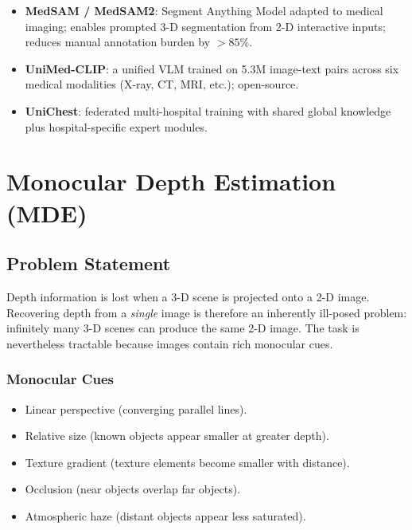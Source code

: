 \documentclass[12pt,a4paper]{report}
\begin{document}
\begin{itemize}[itemsep=2pt]
    \item \textbf{MedSAM / MedSAM2}: Segment Anything Model adapted to medical
          imaging; enables prompted 3-D segmentation from 2-D interactive
          inputs; reduces manual annotation burden by $>85\%$.
    \item \textbf{UniMed-CLIP}: a unified VLM trained on 5.3M image-text pairs
          across six medical modalities (X-ray, CT, MRI, etc.); open-source.
    \item \textbf{UniChest}: federated multi-hospital training with
          shared global knowledge plus hospital-specific expert modules.
\end{itemize}

\chapter{Monocular Depth Estimation (MDE)}

\section{Problem Statement}

Depth information is lost when a 3-D scene is projected onto a 2-D image.
Recovering depth from a \emph{single} image is therefore an inherently
ill-posed problem: infinitely many 3-D scenes can produce the same 2-D
image.  The task is nevertheless tractable because images contain rich
monocular cues.

\subsection{Monocular Cues}

\begin{itemize}[itemsep=1pt]
    \item Linear perspective (converging parallel lines).
    \item Relative size (known objects appear smaller at greater depth).
    \item Texture gradient (texture elements become smaller with distance).
    \item Occlusion (near objects overlap far objects).
    \item Atmospheric haze (distant objects appear less saturated).
\end{itemize}
\end{document}
